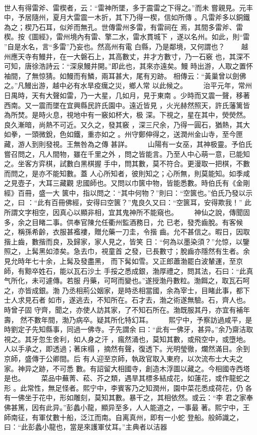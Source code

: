 \documentclass{ctexart}
\begin{document}
\paragraph{}
世人有得雷斧、雷楔者，云：``雷神所墜，多于震雷之下得之。''而未 嘗親見。元丰中，予居隨州，夏月大雷震一木折，其下乃得一楔，信如所傳 。凡雷斧多以銅鐵為之；楔乃石耳，似斧而無孔。世傳雷州多雷，有雷祠在 焉，其間多雷斧、雷楔。按《圖經》，雷州境內有雷、擎二水，雷水貫城下 ，遂以名州。如此，則``雷 ''自是水名，言``多雷''乃妄也。然高州有電 白縣，乃是鄰境，又何謂也？ 　　越州應天寺有鰻井，在一大磐石上，其高數丈，井才方數寸，乃一石竅 也，其深不可知，唐徐浩詩云：``深泉鰻井開。''即此也，其來亦遠矣。鰻 時出游，人取之置怀袖間，了無惊猜。如鰻而有鱗，兩耳甚大，尾有刃跡。 相傳云：``黃巢曾以劍佛之。''凡鰻出游，越中必有水旱疫癘之災，鄉人常 以此候之。 　　治平元年，常州日禺時，天有大聲如雷，乃一大星，几如月，見于東南 。少時而又震一聲，移著西南。又一震而墜在宜興縣民許氏園中。遠近皆見 ，火光赫然照天，許氏藩篱皆為所焚。是時火息，視地中有一竅如杯大，极 深。下視之，星在其中，熒熒然。良久漸暗，尚熱不可近。又久之，發其竅 ，深三尺余，乃得一圓石，猶熱，其大如拳，一頭微銳，色如鐵，重亦如之 。州守鄭伸得之，送潤州金山寺，至今匣藏，游人到則發視。王無咎為之傳 甚詳。 　　山陽有一女巫，其神极靈。予伯氏嘗召問之，凡人間物，雖在千里之外 ，問之皆能言。乃至人中心萌一意，已能知之。坐客方弈棋，試數白黑棋握 手中，問其數，莫不符合。更漫取一把棋，不數而問之，是亦不能知數。蓋 人心所知者，彼則知之；心所無，則莫能知。如季咸之見壺子，大耳三藏觀 忠國師也。又問以巾篋中物，皆能悉數。時伯氏有《金剛經》百冊，盛一大 篋中，指以問之：``其中何物？''則曰：``空篋也。''伯氏乃發以示之，曰 ：``此有百冊佛經，安得曰空篋？''鬼良久又曰：``空篋耳，安得欺我！'' 此所謂文字相空，因真心以顯非相，宜其鬼神所不能窺也。 　　神仙之說，傳聞固多，余之目睹二事。供奉官陳允任衢州監酒務日，允 已老，發禿齒脫。有客候之，稱孫希齡，衣服甚襤褸，贈允藥一刀圭，令揩 齒。允不甚信之。暇日，因取揩上齒，數揩而良，及歸家，家人見之，皆笑 日：``何為以墨染須？''允惊，以鑒照之，上髯黑如漆矣。急去巾，視童首 之發，已長數寸；脫齒亦隱然有生者。余見允時年七十余，上髯及發盡黑， 而下髯如雪。又正郎蕭渤罷白波輦運，至京師，有黥卒姓石，能以瓦石沙土 手挼之悉成銀，渤厚禮之，問其法，石曰：``此真气所化，未可遽傳。若服 丹藥，可呵而變也。''遂授渤丹數粒。渤餌之，取瓦石呵之，亦皆成銀。渤 乃丞相荊公姻家，是時丞相當國，余為宰士，目睹此事，都下士人求見石者 如市，遂逃去，不知所在。石才去，渤之術遂無驗。石，齊人也。時曾子固 守齊，聞之，亦使人訪其家，了不知石所在。渤既服其丹，亦宜有補年壽， 然不數年間，渤乃病卒。疑其所化特幻耳。 　　熙宁中，予察訪過咸平，是時劉定子先知縣事，同過一佛寺。子先謂余 曰：``此有一佛牙，甚异。''余乃齋洁取視之。其牙忽生舍利，如人身之汗 ，瘋然涌也，莫知其數，或飛空中，或墮地。人以手承之，即透過；著床榻 ，摘然有聲，復透下。光明瑩徹，爛然滿目。余到京師，盛傳于公卿間。后 有人迎至京師，執政官取入東府，以次流布士大夫之家。神异之跡，不可悉 數。有詔留大相國寺，創造木浮圖以藏之。今相國寺西塔是也。 　　菜品中蕪菁、菘、芥之類，遇旱其標多結成花，如蓮花，或作龍蛇之形 。此常性，無足怪者。熙宁中，李賓客乃之知潤州，園中菜花悉成荷花，仍 各有一佛坐于花中，形如雕刻，莫知其數。暴干之，其相依然。或云：``李 君之家奉佛甚篤，因有此异。''彭蠡小龍，顯异至多，人人能道之，一事最 著。熙宁中，王師南征，有軍仗數十船，泛江而南。自离真州，即有一小蛇 登船。般師識之，曰：``此彭蠡小龍也，當是來護軍仗耳。''主典者以洁器 
\end{document}
